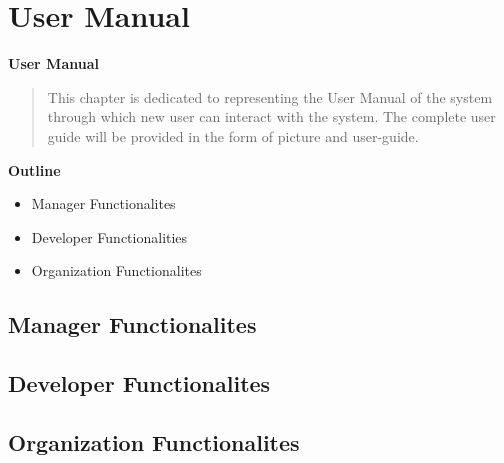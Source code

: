 \section{User Manual}

\vspace{20mm}


\Huge{\textbf{User Manual}}

\vspace{20mm}


\begin{abstract}

    This chapter is dedicated to representing the User Manual of the system
    through which new user can interact with the system. The complete user guide
    will be provided in the form of picture and user-guide.



\end{abstract}

\vspace{20mm}

\large{\textbf{Outline}}

\begin{center}
    \begin{itemize}
        \item Manager Functionalites
        \item Developer Functionalities
        \item Organization Functionalites
    \end{itemize}
\end{center}
\pagebreak


\subsection{Manager Functionalites}
\subsection{Developer Functionalites}
\subsection{Organization Functionalites}
